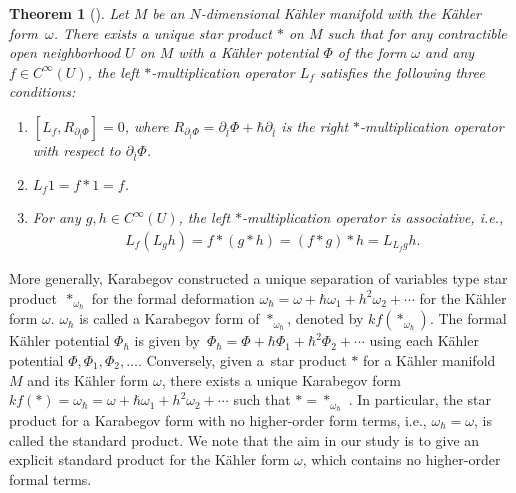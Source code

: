 \documentclass[pdftex]{sigma}
\numberwithin{equation}{section}
\newtheorem{Theorem}{Theorem}[section]
\begin{document}
\begin{Theorem}[\cite{Kara2,Kara1}]\label{thm_Kara_star_opr}
Let $M$ be an $N$-dimensional K\"ahler manifold
with the K\"ahler form~$\omega$.
 There exists a unique star product $\ast$ on $M$ such that for any contractible open neighborhood $U$ on
 $M$ with a K\"ahler potential $\Phi$ of the form $\omega$ and any
 $
 f
 \in
 C^{\infty}
 (U)
$, the left $\ast$-multiplication operator $L_{f}$ satisfies the following three conditions:
\begin{enumerate}\itemsep=0pt
\item[$(1)$] $[ L_{f}, R_{\partial_{\overline{l}}\Phi}] = 0$,
where
$
 R_{\partial_{\overline{l}}\Phi}
 =
 \partial_{\overline{l}}\Phi
 +
 \hbar
 \partial_{\overline{l}}
$
is the right $\ast$-multiplication operator with respect to $\partial_{\overline{l}}\Phi$.
\item[$(2)$]
$
 L_{f}1
 =
 f
 \ast
 1
 =
 f
$.
\item[$(3)$]
For any $
 g,h
 \in
 C^{\infty}
 (U)
$,
the left $\ast$-multiplication operator is associative, i.e.,
\begin{align*}
 L_{f} ( L_{g} h ) = f \ast ( g \ast h ) = ( f \ast g ) \ast h = L_{ L_{f}g } h .
\end{align*}
\end{enumerate}
\end{Theorem}

More generally, Karabegov constructed a unique separation of variables type star product~$\ast_{\omega_{\hbar}}$ for the formal deformation $\omega_{\hbar}=\omega+\hbar\omega_{1}+h^{2}\omega_{2}+\cdots$ for the K\"ahler form $\omega$. $\omega_{\hbar}$ is called a Karabegov form of $\ast_{\omega_{\hbar}}$, denoted by $kf(\ast_{\omega_{\hbar}})$. The formal K\"ahler potential $\Phi_{\hbar}$ is given by~${\Phi_{\hbar}=\Phi+\hbar\Phi_{1}+\hbar^{2}\Phi_{2}+\cdots}$ using each K\"ahler potential $\Phi, \Phi_{1}, \Phi_{2},\dots$. Conversely, given a~star product $\ast$ for a K\"ahler manifold $M$ and its K\"ahler form $\omega$, there exists a unique Karabegov form $kf(\ast)=\omega_{\hbar}=\omega+\hbar\omega_{1}+h^{2}\omega_{2}+\cdots$ such that $\ast=\ast_{\omega_{\hbar}}$ \cite{Kara5}. In particular, the star product for a Karabegov form with no higher-order form terms, i.e., $\omega_{\hbar}=\omega$, is called the standard product. We note that the aim in our study is to give an explicit standard product for the K\"ahler form $\omega$, which contains no higher-order formal terms.
\end{document}
